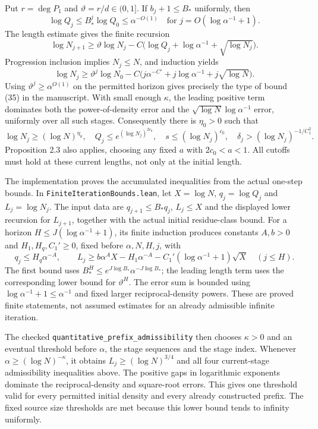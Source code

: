 Put $r=\deg P_1$ and $\vartheta=r/d\in(0,1]$. If $b_j+1\leq B_*$ uniformly, then
\[
 \log Q_j\leq B_*^j\log Q_0\leq\alpha^{-O(1)}
 \quad\text{for }j=O(\log\alpha^{-1}+1).
\]
The length estimate gives the finite recursion
\[
 \log N_{j+1}\geq\vartheta\log N_j
 -C\bigl(\log Q_j+\log\alpha^{-1}+\sqrt{\log N_j}\bigr).
\]
Progression inclusion implies $N_j\leq N$, and induction yields
\[
 \log N_j\geq\vartheta^j\log N_0
 -C\bigl(j\alpha^{-C'}+j\log\alpha^{-1}+j\sqrt{\log N}\bigr).
\]
Using $\vartheta^j\geq\alpha^{O(1)}$ on the permitted horizon gives precisely the type of bound (35) in the manuscript. With small enough $\kappa$, the leading positive term dominates both the power-of-density error and the $\sqrt{\log N}\log\alpha^{-1}$ error, uniformly over all such stages. Consequently there is $\eta_0>0$ such that
\[
 \log N_j\geq(\log N)^{\eta_0},\quad
 Q_j\leq e^{(\log N_j)^{2c_0}},\quad
 s\leq(\log N_j)^{c_0},\quad
 \delta_j>(\log N_j)^{-1/C_1^2}.
\]
Proposition 2.3 also applies, choosing any fixed $a$ with $2c_0<a<1$. All cutoffs must hold at these current lengths, not only at the initial length.

The implementation proves the accumulated inequalities from the actual one-step bounds. In \texttt{FiniteIterationBounds.lean}, let $X=\log N$, $q_j=\log Q_j$ and $L_j=\log N_j$. The input data are $q_{j+1}\leq B_*q_j$, $L_j\leq X$ and the displayed lower recursion for $L_{j+1}$, together with the actual initial residue-class bound. For a horizon $H\leq J(\log\alpha^{-1}+1)$, its finite induction produces constants $A,b>0$ and $H_1,H_q,C_1'\geq0$, fixed before $\alpha,N,H,j$, with
\[
 q_j\leq H_q\alpha^{-A},\qquad
 L_j\geq b\alpha^A X-H_1\alpha^{-A}
       -C_1'(\log\alpha^{-1}+1)\sqrt X\quad(j\leq H).
\]
The first bound uses $B_*^H\leq e^{J\log B_*}\alpha^{-J\log B_*}$; the leading length term uses the corresponding lower bound for $\vartheta^H$. The error sum is bounded using $\log\alpha^{-1}+1\leq\alpha^{-1}$ and fixed larger reciprocal-density powers. These are proved finite statements, not assumed estimates for an already admissible infinite iteration.

The checked \texttt{quantitative\_\allowbreak{}prefix\_\allowbreak{}admissibility} then chooses $\kappa>0$ and an eventual threshold before $\alpha$, the stage sequences and the stage index. Whenever $\alpha\geq(\log N)^{-\kappa}$, it obtains $L_j\geq(\log N)^{3/4}$ and all four current-stage admissibility inequalities above. The positive gaps in logarithmic exponents dominate the reciprocal-density and square-root errors. This gives one threshold valid for every permitted initial density and every already constructed prefix. The fixed source size thresholds are met because this lower bound tends to infinity uniformly.

